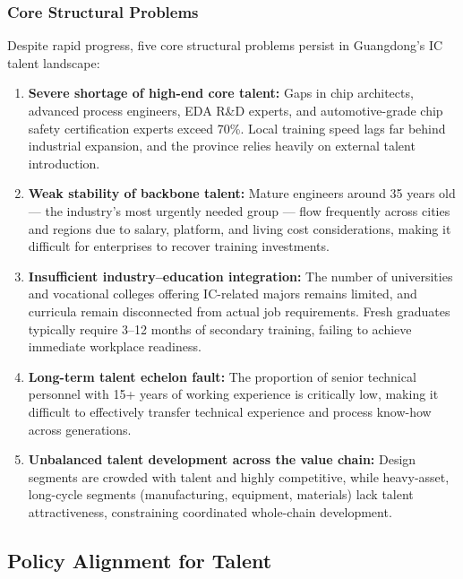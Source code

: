 \documentclass[12pt,a4paper]{article}
\begin{document}
\subsubsection{Core Structural Problems}

Despite rapid progress, five core structural problems persist in Guangdong's
IC talent landscape:

\begin{enumerate}[label=(\arabic*)]
    \item \textbf{Severe shortage of high-end core talent:} Gaps in chip
          architects, advanced process engineers, EDA R\&D experts, and
          automotive-grade chip safety certification experts exceed 70\%.
          Local training speed lags far behind industrial expansion, and
          the province relies heavily on external talent introduction.
    \item \textbf{Weak stability of backbone talent:} Mature engineers around
          35 years old — the industry's most urgently needed group — flow
          frequently across cities and regions due to salary, platform, and
          living cost considerations, making it difficult for enterprises to
          recover training investments.
    \item \textbf{Insufficient industry--education integration:} The number
          of universities and vocational colleges offering IC-related majors
          remains limited, and curricula remain disconnected from actual job
          requirements. Fresh graduates typically require 3--12 months of
          secondary training, failing to achieve immediate workplace readiness.
    \item \textbf{Long-term talent echelon fault:} The proportion of senior
          technical personnel with 15+ years of working experience is critically
          low, making it difficult to effectively transfer technical experience
          and process know-how across generations.
    \item \textbf{Unbalanced talent development across the value chain:}
          Design segments are crowded with talent and highly competitive, while
          heavy-asset, long-cycle segments (manufacturing, equipment, materials)
          lack talent attractiveness, constraining coordinated whole-chain
          development.
\end{enumerate}

\subsection{Policy Alignment for Talent}
\label{sec:talent_policy}
\end{document}
